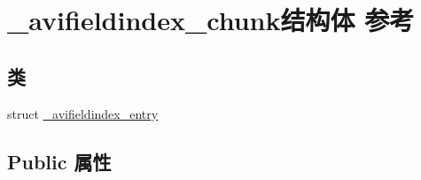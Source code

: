 \hypertarget{struct__avifieldindex__chunk}{}\section{\+\_\+avifieldindex\+\_\+chunk结构体 参考}
\label{struct__avifieldindex__chunk}
\subsection*{类}
\begin{DoxyCompactItemize}
\item 
struct \hyperlink{struct__avifieldindex__chunk_1_1__avifieldindex__entry}{\+\_\+avifieldindex\+\_\+entry}
\end{DoxyCompactItemize}
\subsection*{Public 属性}
